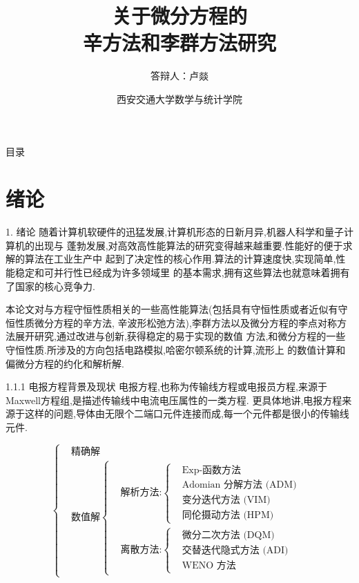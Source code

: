 \documentclass{beamer}
\title[关于微分方程的辛方法和李群方法研究]
{关于微分方程的\\辛方法和李群方法研究}
\author[卢燚]
{答辩人：卢燚} %
\institute[Xi'an Jiaotong University] %
{
  {\normalsize\textbf{指导教师：蒋耀林~教授}}
}
\date[Short Occasion] %
{西安交通大学数学与统计学院}
\begin{document}
\begin{frame}
  \titlepage
\end{frame}

\begin{frame}{目录}
  \tableofcontents %
\end{frame}

\section{绪论}
\begin{frame}{1. 绪论}
\qquad 随着计算机软硬件的迅猛发展,计算机形态的日新月异,机器人科学和量子计算机的出现与
蓬勃发展,对高效高性能算法的研究变得越来越重要.性能好的便于求解的算法在工业生产中
起到了决定性的核心作用.算法的计算速度快,实现简单,性能稳定和可并行性已经成为许多领域里
的基本需求,拥有这些算法也就意味着拥有了国家的核心竞争力.

\qquad 本论文对与方程守恒性质相关的一些高性能算法(包括具有守恒性质或者近似有守恒性质微分方程的辛方法,
辛波形松弛方法),李群方法以及微分方程的李点对称方法展开研究,通过改进与创新,获得稳定的易于实现的数值
方法,和微分方程的一些守恒性质.所涉及的方向包括电路模拟,哈密尔顿系统的计算,流形上
的数值计算和偏微分方程的约化和解析解.
\end{frame}

\begin{frame}{1.1.1 电报方程背景及现状}
\qquad 电报方程,也称为传输线方程或电报员方程,来源于Maxwell方程组,是描述传输线中电流电压属性的一类方程.
更具体地讲,电报方程来源于这样的问题,导体由无限个二端口元件连接而成,每一个元件都是很小的传输线元件.

\begin{equation*}
\left\lbrace\begin{aligned}
	&\text{精确解}\\
	&\text{数值解}\left\lbrace\begin{aligned}
		&\text{解析方法:}\left\lbrace\begin{aligned}
			&\text{Exp-函数方法}\\
			&\text{Adomian 分解方法~(ADM)}\\
			&\text{变分迭代方法~(VIM)}\\
			&\text{同伦摄动方法~(HPM)}
		\end{aligned}
		\right.\\
		&\text{离散方法:}\left\lbrace \begin{aligned}
			&\text{微分二次方法~(DQM)}\\
			&\text{交替迭代隐式方法~(ADI)}\\
			&\text{WENO 方法}
		\end{aligned}
		 \right.
	\end{aligned}\right.
\end{aligned}  \right.
\end{equation*}

\end{frame}
\end{document}
